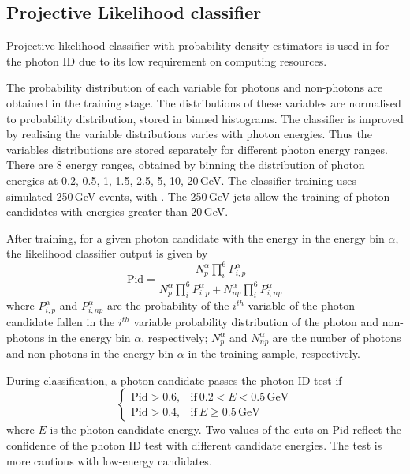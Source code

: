 
\subsection{Projective Likelihood classifier}


Projective likelihood classifier  with probability density estimators is used in \pandora for the photon ID due to its  low requirement on computing resources.

The probability distribution of each variable for photons and non-photons are obtained in the training stage. The distributions of these variables are normalised to probability distribution, stored in binned histograms. The classifier is improved by realising the variable distributions varies with photon energies. Thus the variables distributions are stored separately for different photon energy ranges. There are 8 energy ranges, obtained by binning the distribution of photon energies at 0.2, 0.5, 1, 1.5, 2.5, 5, 10, 20\,GeV. The classifier training uses simulated 250\,GeV \Zprime events, with \Zuds. The 250\,GeV jets allow the training of photon candidates with energies greater than 20\,GeV.


After training, for a given photon candidate with the energy in the energy bin $\alpha$, the likelihood classifier output is given by
\begin{equation}
\text{Pid} = \frac{N_p^\alpha \prod_{i}^6{P_{i,p}^\alpha}}{N_p^\alpha\prod_{i}^6{P_{i,p}^\alpha} + N_{np}^\alpha\prod_{i}^6{P_{i,np}^\alpha}}
\end{equation}
where $P^\alpha_{i,p}$ and $P^\alpha_{i,np}$ are the probability of the   $i^{th}$ variable  of the photon candidate fallen in the  $i^{th}$ variable probability distribution of the photon and non-photons in the energy bin $\alpha$, respectively; $N^\alpha_{p}$ and $N^\alpha_{np}$ are the number of photons and non-photons in the energy bin $\alpha$ in the training sample, respectively.


During classification, a photon candidate passes the photon ID test if
\begin{equation}
\begin{cases}
  \text{Pid} > 0.6, & \text{if}\ 0.2 < E < 0.5\,\text{GeV}\\
  \text{Pid} > 0.4, & \text{if}\ E \geqslant 0.5\,\text{GeV}
\end{cases}
\end{equation}
where $E$ is the photon candidate energy. Two values of the cuts on $\text{Pid}$ reflect the confidence of the photon ID test with different candidate energies. The test is more cautious with low-energy candidates.


